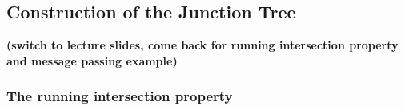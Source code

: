 \subsection{Construction of the Junction Tree}

\begin{frame} 
\textbf{(switch to lecture slides, come back for running intersection property and message passing example)}
\end{frame}


\subsubsection{The running intersection property}

